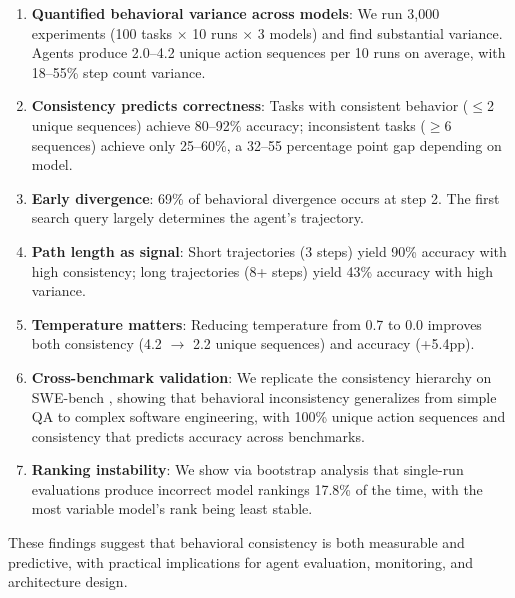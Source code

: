 \documentclass{article}
\begin{document}
\begin{enumerate}
    \item \textbf{Quantified behavioral variance across models}: We run 3,000 experiments (100 tasks $\times$ 10 runs $\times$ 3 models) and find substantial variance. Agents produce 2.0--4.2 unique action sequences per 10 runs on average, with 18--55\% step count variance.
    
    \item \textbf{Consistency predicts correctness}: Tasks with consistent behavior ($\leq$2 unique sequences) achieve 80--92\% accuracy; inconsistent tasks ($\geq$6 sequences) achieve only 25--60\%, a 32--55 percentage point gap depending on model.
    
    \item \textbf{Early divergence}: 69\% of behavioral divergence occurs at step 2. The first search query largely determines the agent's trajectory.
    
    \item \textbf{Path length as signal}: Short trajectories (3 steps) yield 90\% accuracy with high consistency; long trajectories (8+ steps) yield 43\% accuracy with high variance.
    
    \item \textbf{Temperature matters}: Reducing temperature from 0.7 to 0.0 improves both consistency (4.2 $\rightarrow$ 2.2 unique sequences) and accuracy (+5.4pp).
    
    \item \textbf{Cross-benchmark validation}: We replicate the consistency hierarchy on SWE-bench \citep{swebench}, showing that behavioral inconsistency generalizes from simple QA to complex software engineering, with 100\% unique action sequences and consistency that predicts accuracy across benchmarks.
    
    \item \textbf{Ranking instability}: We show via bootstrap analysis that single-run evaluations produce incorrect model rankings 17.8\% of the time, with the most variable model's rank being least stable.
\end{enumerate}

These findings suggest that behavioral consistency is both measurable and predictive, with practical implications for agent evaluation, monitoring, and architecture design.

\end{document}

